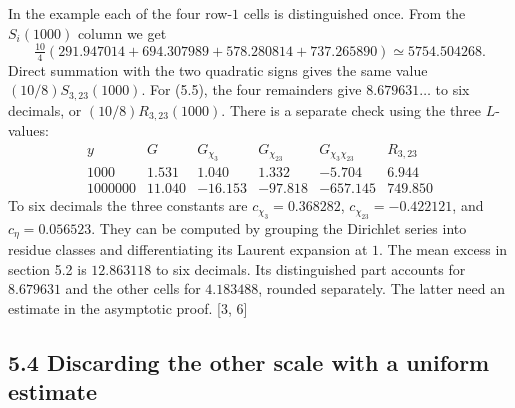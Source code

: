 \documentclass[11pt,letterpaper]{article}
\begin{document}
{In the example each of the four row-$1$ cells is distinguished once. From the $S_i(1000)$ column we get
\begin{equation}\label{D:70}
 \tfrac{10}{4}(291.947014+694.307989+578.280814+737.265890)
       \simeq5754.504268 .
\end{equation}
Direct summation with the two quadratic signs gives the same value $(10/8)S_{3,23}(1000)$. For (5.5), the four remainders give $8.679631\ldots$ to six decimals, or $(10/8)R_{3,23}(1000)$. There is a separate check using the three $L$-values:
\begin{equation}\label{D:71}
 \begin{array}{c|rrrr|r}
 y&G&G_{\chi_3}&G_{\chi_{23}}&G_{\chi_3\chi_{23}}&R_{3,23}\\ \hline
 1000&1.531&1.040&1.332&-5.704&6.944\\
 1000000&11.040&-16.153&-97.818&-657.145&749.850
 \end{array}
\end{equation}
To six decimals the three constants are $c_{\chi_3}=0.368282$, $c_{\chi_{23}}=-0.422121$, and $c_\eta=0.056523$. They can be computed by grouping the Dirichlet series into residue classes and differentiating its Laurent expansion at $1$. The mean excess in section 5.2 is $12.863118$ to six decimals. Its distinguished part accounts for $8.679631$ and the other cells for $4.183488$, rounded separately. The latter need an estimate in the asymptotic proof. [3, 6]

\newpage
\subsection*{5.4 Discarding the other scale with a uniform estimate}

}
\end{document}
